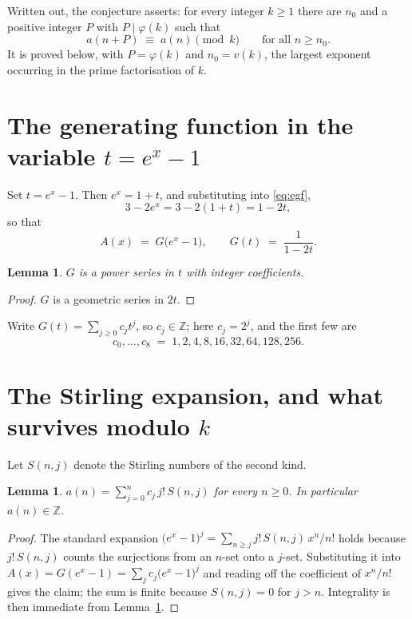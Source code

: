 \documentclass[11pt,a4paper]{article}
\theoremstyle{plain}
\newtheorem{lemma}[theorem]{Lemma}
\theoremstyle{definition}
\begin{document}
Written out, the conjecture asserts: for every integer $k\ge 1$ there are $n_0$ and a
positive integer $P$ with $P\mid\varphi(k)$ such that
\begin{equation}\label{eq:conj}
a(n+P)\;\equiv\;a(n)\pmod{k}\qquad\text{for all } n\ge n_0 .
\end{equation}
It is proved below, with $P=\varphi(k)$ and $n_0=v(k)$, the largest exponent occurring in
the prime factorisation of $k$.

\section{The generating function in the variable $t=e^{x}-1$}

Set $t=e^{x}-1$. Then $e^{x}=1+t$, and substituting into \eqref{eq:egf},
\[
3-2e^{x}=3-2(1+t)=1-2t,
\]
so that
\begin{equation}\label{eq:G}
A(x)\;=\;G\bigl(e^{x}-1\bigr),\qquad
G(t)\;=\;\frac{1}{1-2t}.
\end{equation}

\begin{lemma}\label{lem:int}
$G$ is a power series in $t$ with integer coefficients.
\end{lemma}

\begin{proof}
$G$ is a geometric series in $2t$.
\end{proof}

Write $G(t)=\sum_{j\ge0}c_j t^{j}$, so $c_j\in\mathbb{Z}$; here $c_j=2^{j}$, and the
first few are
\[
c_0,\dots,c_8 \;=\; 1, 2, 4, 8, 16, 32, 64, 128, 256.
\]

\section{The Stirling expansion, and what survives modulo $k$}

Let $S(n,j)$ denote the Stirling numbers of the second kind.

\begin{lemma}\label{lem:stir}
$a(n)=\sum_{j=0}^{n} c_j\, j!\, S(n,j)$ for every $n\ge 0$. In particular $a(n)\in\mathbb{Z}$.
\end{lemma}

\begin{proof}
The standard expansion $\bigl(e^{x}-1\bigr)^{j}
=\sum_{n\ge j} j!\,S(n,j)\,x^{n}/n!$ holds because $j!\,S(n,j)$ counts the surjections
from an $n$-set onto a $j$-set. Substituting it into
$A(x)=G(e^{x}-1)=\sum_j c_j\bigl(e^{x}-1\bigr)^{j}$ and reading off the coefficient of
$x^{n}/n!$ gives the claim; the sum is finite because $S(n,j)=0$ for $j>n$. Integrality is
then immediate from Lemma~\ref{lem:int}.
\end{proof}
\end{document}
